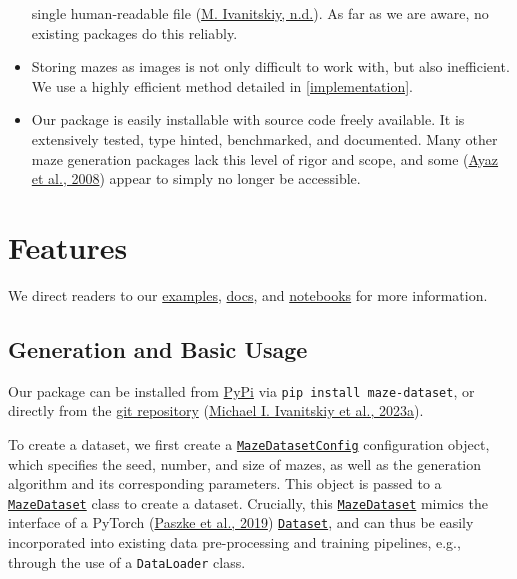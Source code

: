 \documentclass[10pt,a4paper,onecolumn]{article}
\begin{document}
\begin{itemize}
  single human-readable file (\protect\hyperlink{ref-zanj}{M.
  Ivanitskiy, n.d.}). As far as we are aware, no existing packages do
  this reliably.
\item
  Storing mazes as images is not only difficult to work with, but also
  inefficient. We use a highly efficient method detailed in
  \autoref{implementation}.
\item
  Our package is easily installable with source code freely available.
  It is extensively tested, type hinted, benchmarked, and documented.
  Many other maze generation packages lack this level of rigor and
  scope, and some (\protect\hyperlink{ref-ayaz2008maze}{Ayaz et al.,
  2008}) appear to simply no longer be accessible.
\end{itemize}

\hypertarget{features}{%
\section{Features}\label{features}}

We direct readers to our
\href{https://understanding-search.github.io/maze-dataset/examples/maze_examples.html}{examples},
\href{https://understanding-search.github.io/maze-dataset/maze_dataset.html}{docs},
and
\href{https://understanding-search.github.io/maze-dataset/notebooks/}{notebooks}
for more information.

\hypertarget{generation}{%
\subsection{Generation and Basic Usage}\label{generation}}

Our package can be installed from
\href{https://pypi.org/project/maze-dataset/}{PyPi} via
\texttt{pip\ install\ maze-dataset}, or directly from the
\href{https://github.com/understanding-search/maze-dataset}{git
repository} (\protect\hyperlink{ref-maze-dataset-github}{Michael I.
Ivanitskiy et al., 2023a}).

To create a dataset, we first create a
\href{https://understanding-search.github.io/maze-dataset/maze_dataset.html\#MazeDatasetConfig}{\texttt{MazeDatasetConfig}}
configuration object, which specifies the seed, number, and size of
mazes, as well as the generation algorithm and its corresponding
parameters. This object is passed to a
\href{https://understanding-search.github.io/maze-dataset/maze_dataset.html\#MazeDataset}{\texttt{MazeDataset}}
class to create a dataset. Crucially, this
\href{https://understanding-search.github.io/maze-dataset/maze_dataset.html\#MazeDataset}{\texttt{MazeDataset}}
mimics the interface of a PyTorch
(\protect\hyperlink{ref-pytorch}{Paszke et al., 2019})
\href{https://pytorch.org/docs/stable/data.html}{\texttt{Dataset}}, and
can thus be easily incorporated into existing data pre-processing and
training pipelines, e.g., through the use of a \texttt{DataLoader}
class.
\end{document}
